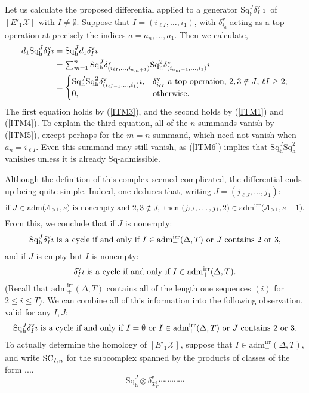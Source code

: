 \documentclass[11pt]{amsart} \renewcommand{\baselinestretch}{1.2}
\theoremstyle{plain}
\theoremstyle{definition}
\newcommand{\calA}{\mathcal{A}}
\newcommand{\calx}{\mathcal{X}}
\newcommand{\Sq}{\mathrm{Sq}}
\newcommand{\LieSteen}{\calA}
\newcommand{\aS}[1]{\mathrm{adm}(\LieSteen_{>1},#1)}
\newcommand{\aSirr}[1]{\mathrm{adm}^\mathrm{irr}(\LieSteen_{>1},#1)}
\newcommand{\aDTirr}{\mathrm{adm}_+^\mathrm{irr}(\Delta,T)}
\newcommand{\TOP}{\mathfrak{T}}
\newcommand{\Eprime}[5]{[E'_{#2}#3]^{#4}_{#5}}
\newcommand{\uver}{^\mathrm{v}}
\newcommand{\dhor}{_\mathrm{h}}
\newcommand{\Sqh}{\mathrm{Sq}\dhor}
\newcommand{\deltav}{\delta\uver}
\begin{document}
\begin{Calculations of HWn}
Let us calculate the proposed differential applied to a generator
$\Sq\dhor^J\deltav_I\imath$ of $\Eprime{blank}{1}{\calx}{}{}$ with $I\neq\emptyset$. Suppose that $I=(i_{\ell I},\ldots,i_1)$, with $\deltav_{i_a}$ acting as a top operation at precisely the indices $a={a_n},\ldots,{a_1}$. Then we calculate, 
\begin{alignat*}{2}
d_1\Sq\dhor^J\deltav_I\imath
&=
\Sq\dhor^Jd_1\deltav_I\imath%
\\
&=
\textstyle\sum_{m=1}^{n}\Sq\dhor^J\deltav_{(i_{\ell I},\ldots,i_{a_{m}+1})} \Sqh^{2} \deltav_{(i_{a_{m}-1},\ldots,i_1)}\imath%
\\
&=
\begin{cases}
\smash{\Sqh^J\Sqh^2\deltav_{(i_{{\ell I}-1},\ldots,i_1)}\imath},&\textup{$\deltav_{i_{\ell I}}$ a top operation, $2,3\notin J$, $\ell I\geq2$};\\
0,&\textup{otherwise}.
\end{cases}
\end{alignat*}
The first equation holds by (\ref{ITM3}), and the second holds by (\ref{ITM1}) and (\ref{ITM4}).
To explain the third equation, %
all of the $n$ summands vanish by (\ref{ITM5}), 
except perhaps for the $m=n$ summand, which need not vanish when $a_n=i_{\ell I}$. Even this summand may still vanish, as (\ref{ITM6}) implies that $\Sqh^J\Sqh^2$ vanishes unless it is already $\Sq$-admissible. 

Although the definition of this complex seemed complicated, the differential ends up being quite simple. Indeed, one deduces that, writing $J=(j_{\ell J},\ldots,j_1)$:
\[
\textup{if }J\in\aS{s}\textup{ is nonempty and } 2,3\notin J,\textup{ then }(j_{\ell J},\ldots,j_1,2)\in\aSirr{s-1}.
\]
From this, we conclude that if $J$ is nonempty:
\begin{equation}
\label{cycle conditions 1}
\textup{$\Sq\dhor^J\deltav_I\imath$ is a cycle if and only if $I \in \aDTirr$ or $J$ contains 2 or 3},
\end{equation}
and if $J$ is empty but $I$ is nonempty:
\begin{equation}
\label{cycle conditions 2}
\textup{$\deltav_I\imath$ is a cycle if and only if $I \in \aDTirr$}.\end{equation}
(Recall that $\aDTirr$ contains all of the length one sequences $(i)$ for $2\leq i \leq T$). We can combine all of this information into the following observation, valid for any $I,J$:
\begin{equation}
\label{cycle conditions 3}
\textup{$\Sq\dhor^J\deltav_I\imath$ is a cycle if and only if $I=\emptyset$ or $I \in \aDTirr$ or $J$ contains 2 or 3}.
\end{equation}
To actually determine the homology of $\Eprime{blank}{1}{\calx}{}{}$, suppose that $I \in \aDTirr$, and write $\textup{SC}_{I,n}$ for the subcomplex spanned by the products of classes of the form ....
\[\Sqh^J\otimes \deltav_{\TOP_T^k}\cdots \cdots \cdots \cdots \]

\end{Calculations of HWn}
\end{document}
